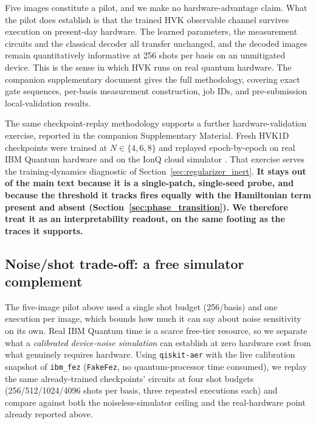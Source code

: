 \documentclass[pdflatex,sn-basic]{sn-jnl}
\begin{document}
Five images constitute a pilot, and we make no hardware-advantage claim. What
the pilot does establish is that the trained HVK observable channel survives
execution on present-day hardware. The learned parameters, the measurement
circuits and the classical decoder all transfer unchanged, and the decoded
images remain quantitatively informative at 256 shots per basis on an
unmitigated device. This is the sense in which HVK runs on real quantum
hardware. The companion supplementary document gives the full methodology,
covering exact gate sequences, per-basis measurement construction, job IDs, and
pre-submission local-validation results.

The same checkpoint-replay methodology supports a further hardware-validation
exercise, reported in the companion Supplementary Material. Fresh HVK1D
checkpoints were trained at $N\in\{4,6,8\}$ and replayed epoch-by-epoch on real
IBM Quantum hardware and on the IonQ cloud simulator \citep{IonQBackends}. That
exercise serves the training-dynamics diagnostic of
Section~\ref{sec:regularizer_inert}. {\color{red}\textbf{It stays out of the
main text because it is a single-patch, single-seed probe, and because the
threshold it tracks fires equally with the Hamiltonian term present and absent
(Section~\ref{sec:phase_transition}). We therefore treat it as an
interpretability readout, on the same footing as the traces it supports.}}
\color{black}


\subsection{Noise/shot trade-off: a free simulator complement}
\label{sec:hardware_robustness}

\color{blue}
The five-image pilot above used a single shot budget (256/basis) and one
execution per image, which bounds how much it can say about noise sensitivity on
its own. Real IBM Quantum time is a scarce free-tier resource, so we separate
what a \emph{calibrated device-noise simulation} can establish at zero hardware
cost from what genuinely requires hardware. Using \texttt{qiskit-aer} with the
live calibration snapshot of \texttt{ibm\_fez} (\texttt{FakeFez}, no
quantum-processor time consumed), we replay the same already-trained
checkpoints' circuits at four shot budgets (256/512/1024/4096 shots per basis,
three repeated executions each) and compare against both the noiseless-simulator
ceiling and the real-hardware point already reported above.
\end{document}
